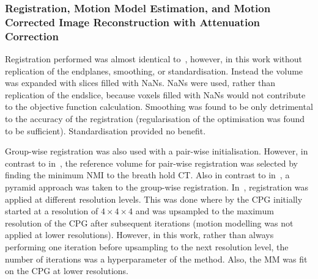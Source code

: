             \subsubsection{Registration, Motion Model Estimation, and Motion Corrected Image Reconstruction with Attenuation Correction} \label{sec:evaluation_of_pet_ct_motion_correction_incorporating_motion_models_using_mlacf_and_complex_gating_schemes_methods_registration_motion_model_estimation_and_motion_corrected_image_reconstruction_with_attenuation_correction}
                Registration performed was almost identical to~, however, in this work without replication of the endplanes, smoothing, or standardisation. Instead the volume was expanded with slices filled with \glspl{NaN}. \glspl{NaN} were used, rather than replication of the endslice, because voxels filled with \glspl{NaN} would not contribute to the objective function calculation. Smoothing was found to be only detrimental to the accuracy of the registration (regularisation of the optimisation was found to be sufficient). Standardisation provided no benefit.

                Group-wise registration was also used with a pair-wise initialisation. However, in contrast to in~, the reference volume for pair-wise registration was selected by finding the minimum \gls{NMI} to the breath hold \gls{CT}. Also in contrast to in~, a pyramid approach was taken to the group-wise registration. In~, registration was applied at different resolution levels. This was done where by the \gls{CPG} initially started at a resolution of $4\times4\times4$ and was upsampled to the maximum resolution of the \gls{CPG} after subsequent iterations (motion modelling was not applied at lower resolutions). However, in this work, rather than always performing one iteration before upsampling to the next resolution level, the number of iterations was a hyperparameter of the method. Also, the \gls{MM} was fit on the \gls{CPG} at lower resolutions.
                
